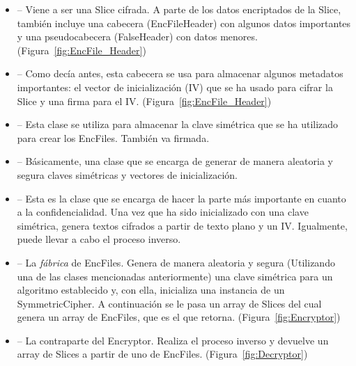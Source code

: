 \begin{itemize}
  \item {} -- Viene a ser una Slice cifrada. A parte de los datos
  encriptados de la Slice, también incluye una cabecera (EncFileHeader) con
  algunos datos importantes y una pseudocabecera (FalseHeader) con datos menores.
  (Figura~\ref{fig:EncFile_Header})

  \item {} -- Como decía antes, esta cabecera se usa para
  almacenar algunos metadatos importantes: el vector de inicialización (IV) que
  se ha usado para cifrar la Slice y una firma para el IV.
  (Figura~\ref{fig:EncFile_Header})

  \item {} -- Esta clase se utiliza para almacenar la clave
  simétrica que se ha utilizado para crear los EncFiles. También va firmada.

  \item {} -- Básicamente, una clase que se encarga de
  generar de manera aleatoria y segura claves simétricas y vectores de
  inicialización.

  \item {} -- Esta es la clase que se encarga de hacer
  la parte más importante en cuanto a la confidencialidad. Una vez que ha sido
  inicializado con una clave simétrica, genera textos cifrados a partir de
  texto plano y un IV. Igualmente, puede llevar a cabo el proceso inverso.

  \item {} -- La \emph{fábrica} de EncFiles. Genera de manera
  aleatoria y segura (Utilizando una de las clases mencionadas anteriormente)
  una clave simétrica para un algoritmo establecido y, con ella, inicializa una
  instancia de un SymmetricCipher. A continuación se le pasa un array de Slices
  del cual genera un array de EncFiles, que es el que retorna.
  (Figura~\ref{fig:Encryptor})

  \item {} -- La contraparte del Encryptor. Realiza el proceso
  inverso y devuelve un array de Slices a partir de uno de EncFiles.
  (Figura~\ref{fig:Decryptor})
\end{itemize}

